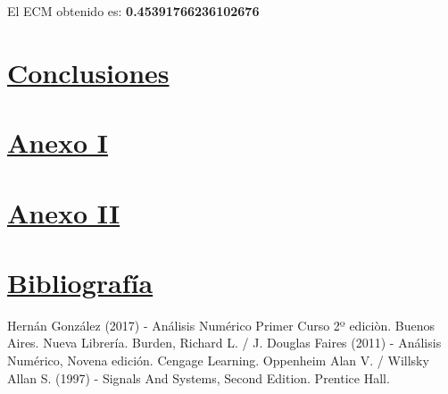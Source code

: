 \documentclass[10pt,a4paper]{article}
\numberwithin{equation}{section}
\numberwithin{figure}{section}
\numberwithin{table}{section}
\begin{document}
El ECM obtenido es: \textbf{0.45391766236102676}


\section{\underline{Conclusiones}}

\section{\underline{Anexo I}}

\section{\underline{Anexo II}}


\section{\underline{Bibliografía}}
\begin{thebibliography}{9}

Hernán González (2017) - Análisis Numérico Primer Curso 2º ediciòn. Buenos Aires. Nueva Librería. 
Burden, Richard L. / J. Douglas Faires (2011) - Análisis Numérico, Novena edición. Cengage Learning.
Oppenheim Alan V. / Willsky Allan S. (1997) - Signals And Systems, Second Edition. Prentice Hall.
\end{thebibliography}
\end{document}

